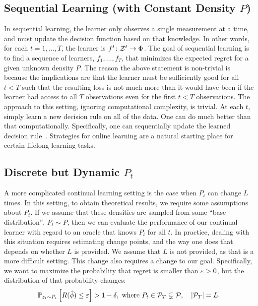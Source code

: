 \documentclass{article}
\begin{document}
\subsection{Sequential Learning (with Constant Density $P$)}
\label{sec:constant}


In sequential learning, the learner only observes a single measurement at a time, and must update the decision function based on that knowledge.  In other words, for each $t = 1,\ldots, T$, the learner is $f^t {\colon} \mathcal{Z}^t \to \Phi$.  
%  
The goal of sequential learning is to find a sequence of learners, $f_1, \ldots, f_T$, that minimizes the expected regret for a given unknown density $P$.  The reason the above statement is non-trivial is because the implications are that the learner must be sufficiently good for all $t<T$ such that the resulting loss is not much more than it would have been if the learner had access to all $T$ observations even for the first $t<T$ observations.
% 
The approach to this setting, ignoring computational complexity, is trivial.  At each $t$, simply learn a new decision rule on all of the data. One can do much better than that computationally.  Specifically, one can sequentially update the learned decision rule~\cite{Xiao2010}. Strategies for online learning are a natural starting place for certain lifelong learning tasks.



\subsection{Discrete but Dynamic $P_t$}
\label{sec:jumps}

A more complicated continual learning setting is the case when $P_t$ can change $L$ times.  In this setting, to obtain theoretical results, we require some assumptions about $P_t$.  If we assume that these densities are sampled from some ``base distribution'', $P_t \sim P$, then we can evaluate the performance of our continual learner with regard to an oracle that knows $P_t$ for all $t$. In practice, dealing with this situation requires estimating change points, and the way one does that depends on whether $L$ is provided.  We assume that $L$ is not provided, as that is a more difficult setting.  This change also requires a change to our goal.  Specifically, we want to maximize the probability that regret is smaller than $\varepsilon>0$, but the distribution of that probability changes:
\begin{align} \label{eq:online}        
    \mathbb{P}_{ z_t \sim P_t} \left[R(\hat{\phi})  \leq \varepsilon \right] > 1 - \delta, \text{ where } P_t \in \mathcal{P}_T \subsetneq \mathcal{P}, \quad |\mathcal{P}_T| = L.
\end{align}
    
\end{document}
